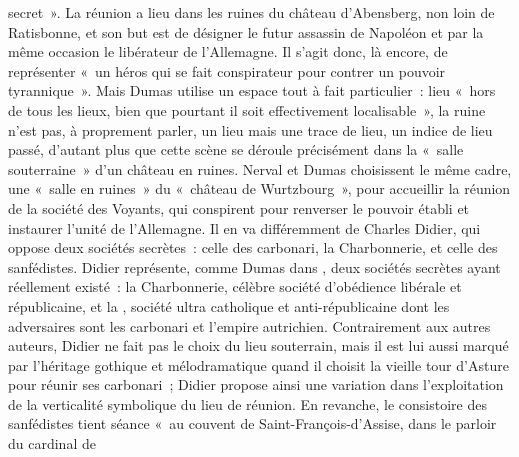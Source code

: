 \documentclass[11pt,twoside,openany]{book}
\newenvironment{lateiDocument}{}{}
\begin{document}
\begin{lateiDocument}
\begin{teiElement}[name={TEI},change={commons\_edition}]
\begin{teiElement}[name={text},type={book},xmlid={book}]
\begin{teiElement}[name={group},type={book},xmlid={book-001}]
\begin{teiElement}[name={group},type={section1},xmlid={section1-001}]
\begin{teiElement}
\begin{teiElement}[name={body},xmlid={body-003}]
\begin{teiDiv}[type={section1},xmlid={div01-2}]
secret ». La réunion a lieu dans les ruines du château d’Abensberg, non loin de Ratisbonne, et son but est de désigner le futur assassin de Napoléon et par la même occasion le libérateur de l’Allemagne. Il s’agit donc, là encore, de représenter « un héros qui se fait conspirateur pour contrer un pouvoir tyrannique ». Mais Dumas utilise un espace tout à fait particulier : lieu « hors de tous les lieux, bien que pourtant \lbrack{}il\rbrack{} soi\lbrack{}t\rbrack{} effectivement localisabl\lbrack{}e\rbrack{} », la ruine n’est pas, à proprement parler, un lieu mais une trace de lieu, un indice de lieu passé, d’autant plus que cette scène se déroule précisément dans la « salle souterraine » d’un château en ruines. Nerval et Dumas choisissent le même cadre, une « salle en ruines » du « château de Wurtzbourg », pour accueillir la réunion de la société des Voyants, qui conspirent pour renverser le pouvoir établi et instaurer l’unité de l’Allemagne. Il en va différemment de Charles Didier, qui oppose deux sociétés secrètes : celle des carbonari, la Charbonnerie, et celle des sanfédistes. Didier représente, comme Dumas dans , deux sociétés secrètes ayant réellement existé : la Charbonnerie, célèbre société d’obédience libérale et républicaine, et la , société ultra catholique et anti-républicaine dont les adversaires sont les carbonari et l’empire autrichien. Contrairement aux autres auteurs, Didier ne fait pas le choix du lieu souterrain, mais il est lui aussi marqué par l’héritage gothique et mélodramatique quand il choisit la vieille tour d’Asture pour réunir ses carbonari ; Didier propose ainsi une variation dans l’exploitation de la verticalité symbolique du lieu de réunion. En revanche, le consistoire des sanfédistes tient séance « au couvent de Saint-François-d’Assise, dans le parloir du cardinal de 
\end{teiDiv}
\end{teiElement}
\end{teiElement}
\end{teiElement}
\end{teiElement}
\end{teiElement}
\end{teiElement}
\end{lateiDocument}
\end{document}
